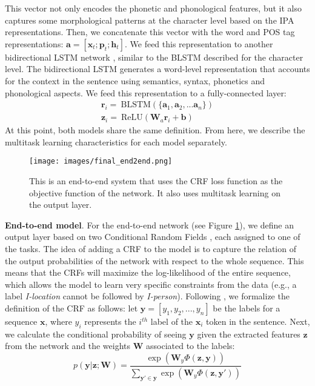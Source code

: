 \documentclass[11pt,a4paper]{article}
\begin{document}
This vector not only encodes the phonetic and phonological features, but it also captures some morphological patterns at the character level based on the IPA representations. Then, we concatenate this vector with the word and POS tag representations: $\mathbf{a} = [\mathbf{x}_t; \mathbf{p}_t; \mathbf{h}_{t}]$. We feed this representation to another bidirectional LSTM network \citep{dyer:2015acl}, similar to the BLSTM described for the character level. The bidirectional LSTM generates a word-level representation that accounts for the context in the sentence using semantics, syntax, phonetics and phonological aspects. We feed this representation to a fully-connected layer:
\begin{gather} \label{common_layer}
\mathbf{r}_i = ~\textrm{BLSTM}(\{\mathbf{a}_1, \mathbf{a}_2, ... \mathbf{a}_n\}) \\
\mathbf{z}_i = ~\textrm{ReLU}(\mathbf{W}_a \mathbf{r}_i + \mathbf{b})
\end{gather}
At this point, both models share the same definition. From here, we describe the multitask learning characteristics for each model separately. 

\begin{figure}
\centering
\texttt{[image: images/final\_end2end.png]}
\caption{ This is an end-to-end system that uses the CRF loss function as the objective function of the network. It also uses multitask learning on the output layer.}
\label{f:system1}
\end{figure}

\noindent \textbf{End-to-end model}. For the end-to-end network (see Figure \ref{f:system1}), we define an output layer based on two Conditional Random Fields \citep{Lafferty:2001:CRF:645530.655813}, each assigned to one of the tasks. The idea of adding a CRF to the model is to capture the relation of the output probabilities of the network with respect to the whole sequence. This means that the CRFs will maximize the log-likelihood of the entire sequence, which allows the model to learn very specific constraints from the data (e.g., a label \textit{I-location} cannot be followed by \textit{I-person}). Following \citet{MaAndHovy:16}, we formalize the definition of the CRF as follows: let $\mathbf{y} = [y_1, y_2, ..., y_n]$ be the labels for a sequence $\mathbf{x}$, where $y_i$ represents the $i^{th}$ label of the $\mathbf{x}_i$ token in the sentence. Next, we calculate the conditional probability of seeing $\mathbf{y}$ given the extracted features $\mathbf{z}$ from the network and the weights $\mathbf{W}$ associated to the labels:
\begin{equation*} \label{eq:crf}
p(\mathbf{y} | \mathbf{z}; \mathbf{W}) = \frac{\exp(\mathbf{W}_y{\Phi(\mathbf{z}, \mathbf{y})})}{\sum_{\mathbf{y'}\in \mathbf{y}} \exp(\mathbf{W}_y{\Phi(\mathbf{z}, \mathbf{y'})})}
\end{equation*}
\end{document}
